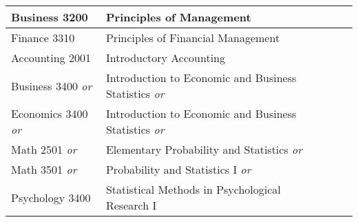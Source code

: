 \documentclass{article}
\begin{document}
\begin{Form}
\begin{longtable}{ |p{3.27cm}|p{6cm}|p{4.8cm}|p{2.3cm}|  }
		Business 3200            & Principles of Management                                   & \TextField[name=3200_instructor,width=4.8cm,charsize=8pt,bordercolor=1 1 1,borderstyle=U]{}  & \TextField[name=3200_grade,width=2.2cm,charsize=8pt,bordercolor=1 1 1]{{}}  \\
		\hline
		Finance 3310             & Principles of Financial Management                         & \TextField[name=3310_instructor,width=4.8cm,charsize=8pt,bordercolor=1 1 1,borderstyle=U]{}  & \TextField[name=3310_grade,width=2.2cm,charsize=8pt,bordercolor=1 1 1]{{}}  \\
		\hline
		Accounting 2001          & Introductory Accounting                                    & \TextField[name=2001_instructor,width=4.8cm,charsize=8pt,bordercolor=1 1 1,borderstyle=U]{}  & \TextField[name=2001_grade,width=2.2cm,charsize=8pt,bordercolor=1 1 1]{{}}  \\
		\hline

		Business 3400 \emph{or}  & Introduction to Economic and Business Statistics \emph{or} & \TextField[name=b3400_instructor,width=4.8cm,charsize=8pt,bordercolor=1 1 1,borderstyle=U]{} & \TextField[name=b3400_grade,width=2.2cm,charsize=8pt,bordercolor=1 1 1]{{}} \\

		Economics 3400 \emph{or} & Introduction to Economic and Business Statistics \emph{or} & \TextField[name=e3400_instructor,width=4.8cm,charsize=8pt,bordercolor=1 1 1,borderstyle=U]{} & \TextField[name=e3400_grade,width=2.2cm,charsize=8pt,bordercolor=1 1 1]{{}} \\

		Math 2501 \emph{or}      & Elementary Probability and Statistics \emph{or}            & \TextField[name=2501_instructor,width=4.8cm,charsize=8pt,bordercolor=1 1 1,borderstyle=U]{}  & \TextField[name=2501_grade,width=2.2cm,charsize=8pt,bordercolor=1 1 1]{{}}  \\

		Math 3501 \emph{or}      & Probability and Statistics I \emph{or}                     & \TextField[name=3501_instructor,width=4.8cm,charsize=8pt,bordercolor=1 1 1,borderstyle=U]{}  & \TextField[name=3501_grade,width=2.2cm,charsize=8pt,bordercolor=1 1 1]{{}}  \\

		Psychology 3400          & Statistical Methods in Psychological Research I            & \TextField[name=p3400_instructor,width=4.8cm,charsize=8pt,bordercolor=1 1 1,borderstyle=U]{} & \TextField[name=p3400_grade,width=2.2cm,charsize=8pt,bordercolor=1 1 1]{{}} \\
		\hline


\end{longtable}
\end{Form}
\end{document}
